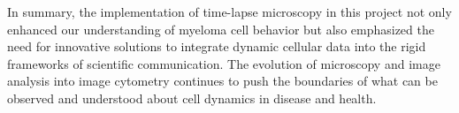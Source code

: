 

























In summary, the implementation of time-lapse microscopy in this project not only
enhanced our understanding of myeloma cell behavior but also emphasized the need
for innovative solutions to integrate dynamic cellular data into the rigid
frameworks of scientific communication. The evolution of microscopy and image
analysis into image cytometry continues to push the boundaries of what can be
observed and understood about cell dynamics in disease and health.




